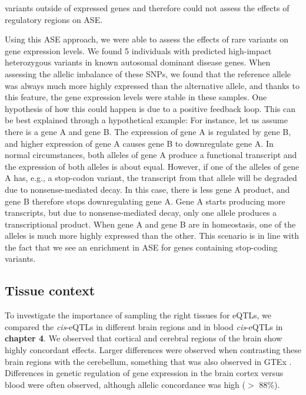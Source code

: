 variants outside of expressed genes and therefore could not assess the effects of regulatory regions on ASE.


Using this ASE approach, we were able to assess the effects of rare variants on gene expression levels. We found 5 individuals with predicted high-impact heterozygous variants in known autosomal dominant disease genes. When assessing the allelic imbalance of these SNPs, we found that the reference allele was always much more highly expressed than the alternative allele, and thanks to this feature, the gene expression levels were stable in these samples. One hypothesis of how this could happen is due to a positive feedback loop. This can be best explained through a hypothetical example: For instance, let us assume there is a gene A and gene B. The expression of gene A is regulated by gene B, and higher expression of gene A causes gene B to downregulate gene A. In normal circumstances, both alleles of gene A produce a functional transcript and the expression of both alleles is about equal. However, if one of the alleles of gene A has, e.g., a stop-codon variant, the transcript from that allele will be degraded due to nonsense-mediated decay. In this case, there is less gene A product, and gene B therefore stops downregulating gene A. Gene A starts producing more transcripts, but due to nonsense-mediated decay, only one allele produces a transcriptional product. When gene A and gene B are in homeostasis, one of the alleles is much more highly expressed than the other. This scenario is in line with the fact that we see an enrichment in ASE for genes containing stop-coding variants.


\subsection{Tissue context}
To investigate the importance of sampling the right tissues for eQTLs, we compared the \emph{cis}-eQTLs in different brain regions and in blood \emph{cis}-eQTLs in \textbf{chapter 4}. We observed that cortical and cerebral regions of the brain show highly concordant effects. Larger differences were observed when contrasting these brain regions with the cerebellum, something that was also observed in GTEx \cite{thegtexconsortiumGTExConsortiumAtlas2020}. Differences in genetic regulation of gene expression in the brain cortex versus blood were often observed, although allelic concordance was high ($>$ 88\%). 

